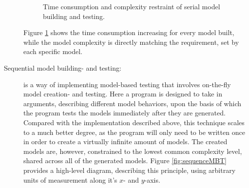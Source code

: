 \begin{description}
\begin{figure}
		\caption{Time consumption and complexity restraint of serial model building and testing.}
		\label{fig:serialMBT}
	\end{figure}
	Figure \ref{fig:serialMBT} shows the time consumption increasing for every model built, while the model complexity is directly matching the requirement, set by each specific model.
	\item[Sequential model building- and testing:]
	is a way of implementing model-based testing that involves on-the-fly model creation- and testing. Here a program is designed to take in arguments, describing different model behaviors, upon the basis of which the program tests the models immediately after they are generated. Compared with the implementation described above, this technique scales to a much better degree, as the program will only need to be written once in order to create a virtually infinite amount of models. The created models are, however, constrained to the lowest common complexity level, shared across all of the generated models. Figure \ref{fig:sequenceMBT} provides a high-level diagram, describing this principle, using arbitrary units of measurement along it's $x$- and $y$-axis.
	\begin{figure}
		\centering
\end{figure}
\end{description}

